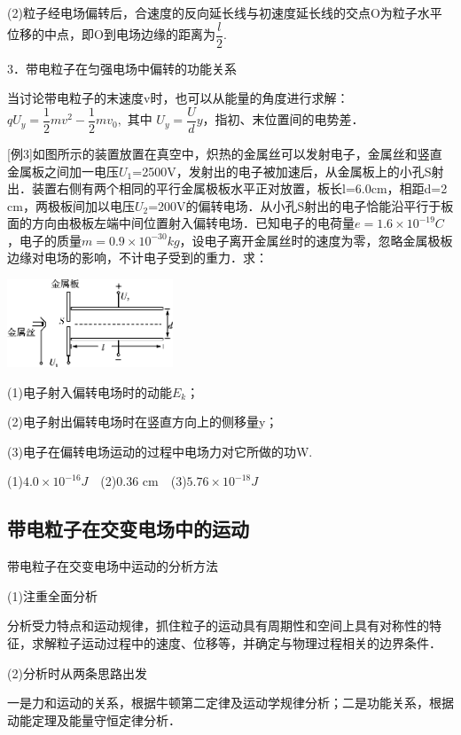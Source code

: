 \documentclass[cn,10.5pt,chinese,mac,chinesefont=founder]{elegantbook}
\begin{document}
(2)粒子经电场偏转后，合速度的反向延长线与初速度延长线的交点O为粒子水平位移的中点，即O到电场边缘的距离为$\dfrac{l}{2}$.

3．带电粒子在匀强电场中偏转的功能关系

当讨论带电粒子的末速度v时，也可以从能量的角度进行求解：$q U_{y}=\dfrac{1}{2} m v^{2}-\dfrac{1}{2} m v_{0},$ 其中 $U_{y}=\dfrac{U}{d}y$，指初、末位置间的电势差．

{[}例3{]}如图所示的装置放置在真空中，炽热的金属丝可以发射电子，金属丝和竖直金属板之间加一电压$U_1$=2500V，发射出的电子被加速后，从金属板上的小孔S射出．装置右侧有两个相同的平行金属极板水平正对放置，板长l=6.0cm，相距d=2 cm，两极板间加以电压$U_2$=200V的偏转电场．从小孔S射出的电子恰能沿平行于板面的方向由极板左端中间位置射入偏转电场．已知电子的电荷量$e=1.6\times 10^{-19}C$，电子的质量$m=0.9\times 10^{-30}kg$，设电子离开金属丝时的速度为零，忽略金属极板边缘对电场的影响，不计电子受到的重力．求：

\begin{center}\includegraphics[width=1.94792in,height=1.03125in]{media/image300.png}\end{center}

(1)电子射入偏转电场时的动能$E_k$；

(2)电子射出偏转电场时在竖直方向上的侧移量y；

(3)电子在偏转电场运动的过程中电场力对它所做的功W.

\begin{solution}
	(1)$4.0\times 10^{-16} J$　(2)0.36 cm　(3)$5.76\times 10^{-18} J$
\end{solution}
\subsection{带电粒子在交变电场中的运动}

带电粒子在交变电场中运动的分析方法

(1)注重全面分析

分析受力特点和运动规律，抓住粒子的运动具有周期性和空间上具有对称性的特征，求解粒子运动过程中的速度、位移等，并确定与物理过程相关的边界条件．

(2)分析时从两条思路出发

一是力和运动的关系，根据牛顿第二定律及运动学规律分析；二是功能关系，根据动能定理及能量守恒定律分析．
\end{document}
